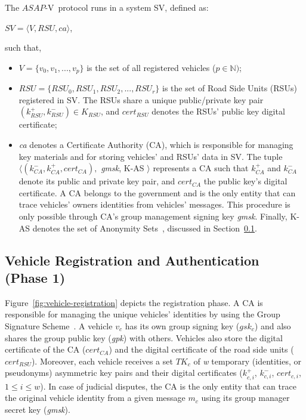 \documentclass[preprint,12pt]{elsarticle}
\newcommand{\protocolname}{$ASAP$-V}
\begin{document}
The \protocolname~protocol runs in a system SV, defined as:

\begin{center}
$SV = \langle V, RSU, ca \rangle$,
\end{center}

\noindent
such that,

\begin{itemize}
	\item  $V = \{v_{0}, v_{1}, ..., v_{p}\}$ is the set of all registered vehicles ($p \in \mathbb{N})$;
	
	\item $RSU = \{RSU_{0}, RSU_{1}, RSU_{2}, ..., RSU_{r}\}$ is the set of Road Side Units (RSUs) registered in SV. The RSUs share a unique public/private key pair $(k^{+}_{RSU}, k^{-}_{RSU}) \in K_{RSU}$, and $cert_{RSU}$ denotes the RSUs' public key digital certificate;
	
	\item \textit{ca} denotes a Certificate Authority (CA), which is responsible for managing key materials and for storing vehicles' and RSUs' data in SV. The tuple $\langle (k^{-}_{CA}, k^{+}_{CA}, cert_{CA}),$ \textit{gmsk}, K-AS $\rangle$ represents a CA such that $k^{+}_{CA}$ and $k^{-}_{CA}$ denote its public and private key pair, and $cert_{CA}$ the public key's digital certificate. A CA belongs to the government and is the only entity that can trace vehicles' owners identities from vehicles' messages. This procedure is only possible through CA's group management signing key \textit{gmsk}. Finally, K-AS denotes the set of Anonymity Sets~\cite{privacytecterminology1}, discussed in Section~\ref{sec:phase1}.
\end{itemize}

\subsection{Vehicle Registration and Authentication (Phase 1)}
\label{sec:phase1}
Figure~\ref{fig:vehicle-registration} depicts the registration phase. A CA is responsible for managing the unique vehicles' identities by using the Group Signature Scheme~\cite{group-sign}. A vehicle $v_{c}$  has its own group signing key ($gsk_{c}$) and also shares the group public key (\textit{gpk}) with others. Vehicles also store the digital certificate of the CA ($cert_{CA}$) and the digital certificate of the road side units ($cert_{RSU}$). Moreover, each vehicle receives a set $TK_{c}$ of \textit{w} temporary (identities, or pseudonyms) asymmetric key pairs and their digital certificates ($k^{+}_{c,i}$, $k^{-}_{c,i}$, $cert_{c,i}$, $1 \le i \le w$). In case of judicial disputes, the CA is the only entity that can trace the original vehicle identity from a given message $m_{c}$ using its group manager secret key (\textit{gmsk}).
\end{document}
